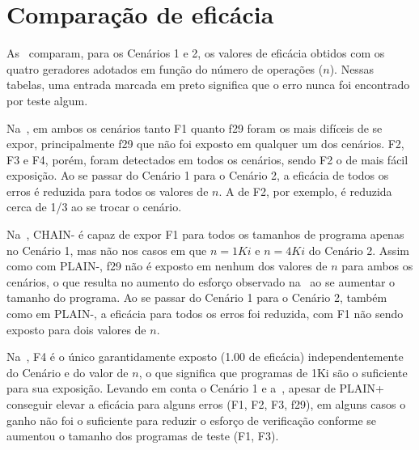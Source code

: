 \section{Comparação de eficácia}

As~
comparam, para os Cenários 1 e 2, os valores de eficácia obtidos com os quatro
geradores adotados em função do número de operações ($n$). Nessas tabelas, uma
entrada marcada em preto significa que o erro nunca foi encontrado por teste
algum.



Na~, em ambos os cenários tanto F1 quanto f29 foram os
mais difíceis de se expor, principalmente f29 que não foi exposto em qualquer
um dos cenários. F2, F3 e F4, porém, foram detectados em todos os cenários,
sendo F2 o de mais fácil exposição. Ao se passar do Cenário 1 para o Cenário 2,
a eficácia de todos os erros é reduzida para todos os valores de $n$. A de F2,
por exemplo, é reduzida cerca de 1/3 ao se trocar o cenário.



Na~, CHAIN- é capaz de expor F1 para todos os tamanhos
de programa apenas no Cenário 1, mas não nos casos em que $n = 1Ki$ e $n = 4Ki$
do Cenário 2. Assim como com PLAIN-, f29 não é exposto em nenhum dos valores de
$n$ para ambos os cenários, o que resulta no aumento do esforço observado
na~ ao se aumentar o tamanho do programa.  Ao se passar
do Cenário 1 para o Cenário 2, também como em PLAIN-, a eficácia para todos os
erros foi reduzida, com F1 não sendo exposto para dois valores de $n$.



Na~, F4 é o único garantidamente exposto (1.00 de
eficácia) independentemente do Cenário e do valor de $n$, o que significa que
programas de 1Ki são o suficiente para sua exposição. Levando em conta o
Cenário 1 e a~, apesar de PLAIN+ conseguir elevar a
eficácia para alguns erros (F1, F2, F3, f29), em alguns casos o ganho não foi o
suficiente para reduzir o esforço de verificação conforme se aumentou o tamanho
dos programas de teste (F1, F3).



